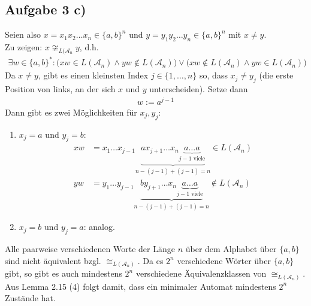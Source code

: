 \documentclass[12pt,a4paper]{article}
\newcommand{\A}{\mathcal{A}}
\begin{document}
\subsection*{Aufgabe 3 c)}
Seien also $x=x_1 x_2\hdots x_n\in\lbrace a,b\rbrace^n$ und $y=y_1 y_2\hdots y_n\in\lbrace a,b\rbrace^n$ mit $x\neq y$.\\
Zu zeigen: $x\not\cong_{L(\A_n} y$, d.h.
\begin{align*}
	\exists w\in\lbrace a,b\rbrace^\ast:\big(xw\in L(\A_n)\wedge yw\not\in L(\A_n)\big)\vee\big(xw\not\in L(\A_n)\wedge yw\in L(\A_n)\big)
\end{align*}
Da $x\neq y$, gibt es einen kleinsten Index $j\in\lbrace1,\ldots,n\rbrace$ so, dass $x_j\neq y_j$ (die erste Position von links, an der sich $x$ und $y$ unterscheiden). Setze dann 
\begin{align*}
	w:=a^{j-1}
\end{align*}
Dann gibt es zwei Möglichkeiten für $x_j,y_j$:
\begin{enumerate}
	\item $x_j=a$ und $y_j=b$:\\
	\begin{align*}
		xw&=x_1\hdots x_{j-1}\underbrace{ a x_{j+1}\hdots x_n\underbrace{a\hdots a}_{j-1\text{ viele}}}_{n-(j-1)+(j-1)=n}\in L(\A_n)\\
		yw&=y_1\hdots y_{j-1}\underbrace{ b y_{j+1}\hdots x_n\underbrace{a\hdots a}_{j-1\text{ viele}}}_{n-(j-1)+(j-1)=n}\not\in L(\A_n)
	\end{align*}
	\item $x_j=b$ und $y_j=a$: analog.
\end{enumerate}

Alle paarweise verschiedenen Worte der Länge $n$ über dem Alphabet über $\lbrace a,b\rbrace$ sind nicht äquivalent bzgl. $\cong_{L(\A_n)}$. Da es $2^n$ verschiedene Wörter über $\lbrace a,b\rbrace$ gibt, so gibt es auch mindestens $2^n$ verschiedene Äquivalenzklassen von $\cong_{L(\A_n)}$. Aus Lemma 2.15 (4) folgt damit, dass ein minimaler Automat mindestens $2^n$ Zustände hat.
\end{document}
